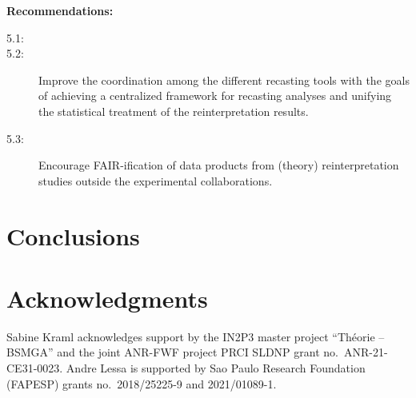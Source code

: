 \documentclass[11pt]{article}
\begin{document}
\noindent
\textbf{Recommendations:}
\begin{description}
\item[5.1:] 
   \item[5.2:] Improve the coordination among the different recasting tools with the goals of achieving a centralized framework for recasting analyses and unifying the statistical treatment of the reinterpretation results.
   \item[5.3:] Encourage FAIR-ification of data products from (theory) reinterpretation studies outside the experimental collaborations. %
\end{description}
\section{Conclusions}

\section*{Acknowledgments}

Sabine Kraml acknowledges support by the IN2P3 master project ``Th\'eorie -- BSMGA'' and the joint ANR-FWF project PRCI SLDNP grant no.~ANR-21-CE31-0023.
Andre Lessa is supported by Sao Paulo Research Foundation (FAPESP) grants no.~2018/25225-9 and 2021/01089-1.



\def\thefootnote{\fnsymbol{footnote}}
\setcounter{footnote}{0}




\end{document}
